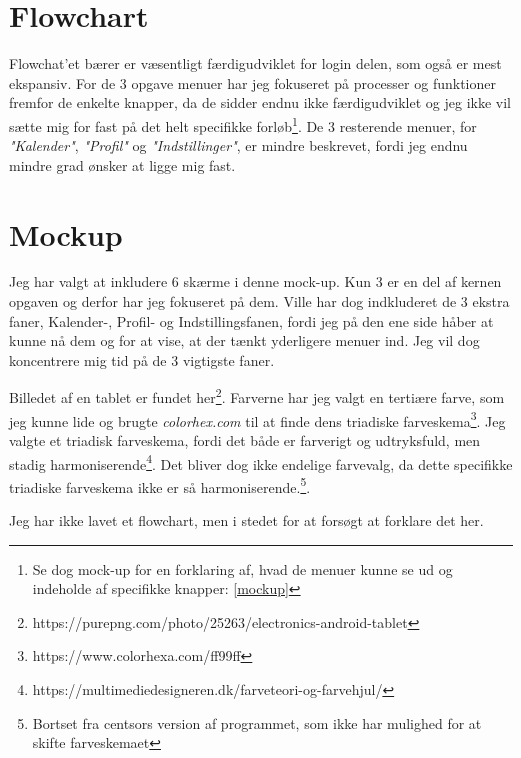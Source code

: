 \documentclass{report}
\begin{document}
\section{Flowchart}

Flowchat'et bærer er væsentligt færdigudviklet for login delen, som også er mest ekspansiv. For de 3 opgave menuer har jeg fokuseret på processer og funktioner fremfor de enkelte knapper, da de sidder endnu ikke færdigudviklet og jeg ikke vil sætte mig for fast på det helt specifikke forløb\footnote{Se dog mock-up for en forklaring af, hvad de menuer kunne se ud og indeholde af specifikke knapper: \autoref{mockup}}. De 3 resterende menuer, for \textit{"Kalender"}, \textit{"Profil"} og \textit{"Indstillinger"}, er mindre beskrevet, fordi jeg endnu mindre grad ønsker at ligge mig fast.\par



\section{Mockup}
\label{mockup}

Jeg har valgt at inkludere 6 skærme i denne mock-up. Kun 3 er en del af kernen opgaven og derfor har jeg fokuseret på dem. Ville har dog indkluderet de 3 ekstra faner, Kalender-, Profil- og Indstillingsfanen, fordi jeg på den ene side håber at kunne nå dem og for at vise, at der tænkt yderligere menuer ind. Jeg vil dog koncentrere mig tid på de 3 vigtigste faner.\par{}
Billedet af en tablet er fundet her\footnote{https://purepng.com/photo/25263/electronics-android-tablet}. Farverne har jeg valgt en tertiære farve, som jeg kunne lide og brugte \textit{colorhex.com} til at finde dens triadiske farveskema\footnote{https://www.colorhexa.com/ff99ff}. Jeg valgte et triadisk farveskema, fordi det både er farverigt og udtryksfuld, men stadig harmoniserende\footnote{https://multimediedesigneren.dk/farveteori-og-farvehjul/}. Det bliver dog ikke endelige farvevalg, da dette specifikke triadiske farveskema ikke er så harmoniserende.\footnote{Bortset fra centsors version af programmet, som ikke har mulighed for at skifte farveskemaet}.\par{}
Jeg har ikke lavet et flowchart, men i stedet for at forsøgt at forklare det her.\par{}
\end{document}

